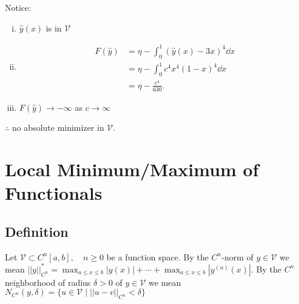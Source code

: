 \documentclass[12pt,twoside]{article}
\begin{document}
\begin{enumerate}
\begin{figure}[ht]
  \end{figure}
  Notice:
  \begin{enumerate}[(i)]
  \item $\hat{y}(x)$ is in $\mathcal{V}$
  \item
    \begin{align*}
      F(\hat{y}) &= \eta - \int_0^1{(\hat{y}(x)-3x)}^4\dd{x} \\
      &= \eta - \int_0^1c^4x^4{(1-x)}^4\dd{x} \\
      &= \eta - \frac{c^4}{630}.
    \end{align*}
  \item $F(\hat{y})\rightarrow -\infty$ as $c\rightarrow\infty$
  \end{enumerate}
  $\therefore$ no absolute minimizer in $\mathcal{V}$.
\end{enumerate}

\section{Local Minimum/Maximum of Functionals}
\subsection{Definition}
Let $\mathcal{V}\subset C^n[a,b],\quad n\ge0$ be a function space. By the
$C^n$-norm of $y\in\mathcal{V}$ we mean $||y||^*_{C^n}=\max_{a\le x\le
  b}|y(x)|+\cdots+\max_{a\le x\le b}|y^{(n)}(x)|$. By the $C^n$ neighborhood of
radius $\delta>0$ of $y\in\mathcal{V}$ we mean
$N_{C^n}(y,\delta)=\{u\in\mathcal{V} \;|\; {||u-v||}_{C^n}<\delta\}$
\end{document}

